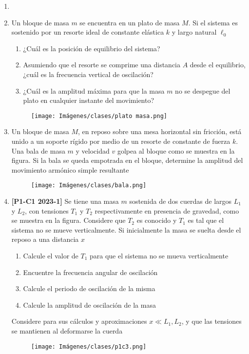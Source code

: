 \documentclass[letterpaper,11pt]{article}
\begin{document}
\begin{enumerate}\setlength{\itemsep}{0.4cm}


\item[]

\item Un bloque de masa $m$ se encuentra en un plato de masa $M$. Si el sistema es sostenido por un resorte ideal de constante elástica $k$ y largo natural $\ell_0$
\begin{enumerate}
    \item ¿Cuál es la posición de equilibrio del sistema?

    \item Asumiendo que el resorte se comprime una distancia $A$ desde el equilibrio, ¿cuál es la frecuencia vertical de oscilación?

    \item ¿Cuál es la amplitud máxima para que la masa $m$ no se despegue del plato en cualquier instante del movimiento?
\end{enumerate}

\begin{figure}[H]
    \centering
    \texttt{[image: Imágenes/clases/plato masa.png]}
\end{figure}


\item Un bloque de masa $M$, en reposo sobre una mesa horizontal sin fricción, está unido a un soporte rígido por medio de un resorte de constante de fuerza $k$. Una bala de masa $m$ y velocidad $v$ golpea al bloque como se muestra en la figura. Si la bala se queda empotrada en el bloque, determine la amplitud del movimiento armónico simple resultante

\begin{figure}[H]
    \centering
    \texttt{[image: Imágenes/clases/bala.png]}
\end{figure}

\item \textbf{[P1-C1 2023-1]} Se tiene una masa $m$ sostenida de dos cuerdas de largos $L_1$ y $L_2$, con tensiones $T_1$ y $T_2$ respectivamente en presencia de gravedad, como se muestra en la figura. Considere que $T_2$ es conocido y $T_1$ es tal que el sistema no se mueve verticalmente.
Si inicialmente la masa se suelta desde el reposo a una distancia $x$

\begin{enumerate}
    \item Calcule el valor de $T_1$ para que el sistema no se mueva verticalmente
    \item Encuentre la frecuencia angular de oscilación
    \item Calcule el periodo de oscilación de la misma
    \item Calcule la amplitud de oscilación de la masa
\end{enumerate}

Considere para sus cálculos y aproximaciones $x\ll L_1, L_2$, y que las tensiones se mantienen al deformarse la cuerda

\begin{figure}[H]
    \centering
    \texttt{[image: Imágenes/clases/p1c3.png]}
\end{figure}

\end{enumerate}
\end{document}
